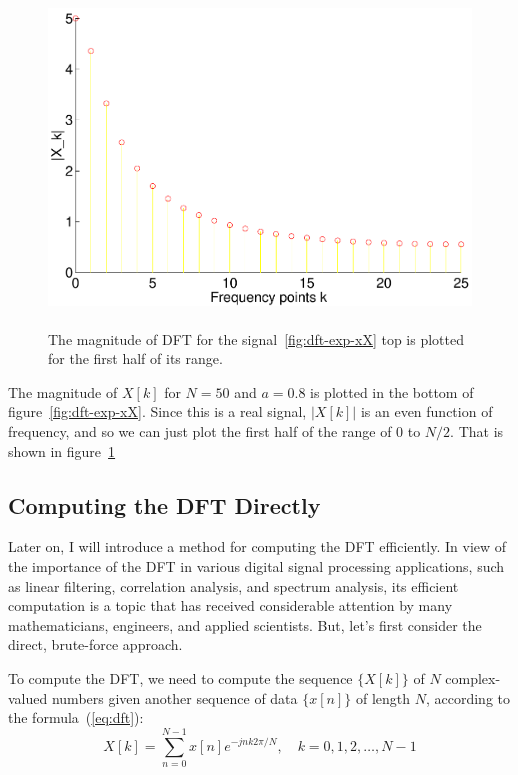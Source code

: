 \begin{figure}
\centerline{\includegraphics[height=3.5in]{ch-fft/dft_expX2}}
\caption{The magnitude of DFT for the
signal~\protect\ref{fig:dft-exp-xX} top is plotted for the first half
of its range.
\label{fig:dft-exp-X2}}
\end{figure}

The magnitude of $X[k]$ for $N=50$ and $a=0.8$ is plotted in the bottom
of figure~\ref{fig:dft-exp-xX}.  Since this is a real signal, $|X[k]|$
is an even function of frequency, and so we can just plot the first
half of the range of 0 to $N/2$. That is shown in
figure~\ref{fig:dft-exp-X2}

\subsection{Computing the DFT Directly}

Later on, I will introduce a method for computing the DFT efficiently.
In view of the importance of the DFT in various digital signal
processing applications, such as linear filtering, correlation
analysis, and spectrum analysis, its efficient computation is a topic
that has received considerable attention by many mathematicians,
engineers, and applied scientists. But, let's first consider the
direct, brute-force approach.

To compute the DFT, we need to compute the sequence $\{X[k]\}$ of $N$
complex-valued numbers given another sequence of data $\{x[n]\}$ of
length $N$, according to the formula~(\ref{eq:dft}):
\begin{equation*}
X[k] = \sum_{n=0}^{N-1} x[n] e^{-j n k 2\pi/N}, \quad k = 0,1,2,\ldots,
N-1
\end{equation*}

